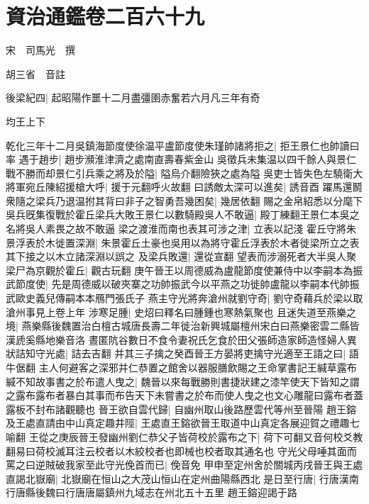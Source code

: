 \chapter{資治通鑑卷二百六十九}
宋　司馬光　撰

胡三省　音註

後梁紀四|{
	起昭陽作噩十二月盡彊圉赤奮若六月凡三年有奇}


均王上下

乾化三年十二月吳鎮海節度使徐温平盧節度使朱瑾帥諸將拒之|{
	拒王景仁也帥讀曰率}
遇于趙步|{
	趙步瀕淮津濟之處南直壽春紫金山}
吳徵兵未集温以四千餘人與景仁戰不勝而却景仁引兵乘之將及於隘|{
	隘烏介翻險狹之處為隘}
吳吏士皆失色左驍衛大將軍宛丘陳紹援槍大呼|{
	援于元翻呼火故翻}
曰誘敵太深可以進矣|{
	誘音酉}
躍馬還鬭衆隨之梁兵乃退温拊其背曰非子之智勇吾幾困矣|{
	幾居依翻}
賜之金帛紹悉以分麾下吳兵旣集復戰於霍丘梁兵大敗王景仁以數騎殿吳人不敢逼|{
	殿丁練翻王景仁本吳之名將吳人素畏之故不敢逼}
梁之渡淮而南也表其可涉之津|{
	立表以記淺}
霍丘守將朱景浮表於木徙置深淵|{
	朱景霍丘土豪也吳用以為將守霍丘浮表於木者徙梁所立之表其下接之以木立諸深淵以誤之}
及梁兵敗還|{
	還從宣翻}
望表而涉溺死者大半吳人聚梁尸為京觀於霍丘|{
	觀古玩翻}
庚午晉王以周德威為盧龍節度使兼侍中以李嗣本為振武節度使|{
	先是周德威以破夾寨之功帥振武今以平燕之功徙帥盧龍以李嗣本代帥振武歐史義兒傳嗣本本鴈門張氏子}
燕主守光將奔滄州就劉守奇|{
	劉守奇藉兵於梁以取滄州事見上卷上年}
涉寒足腫|{
	史炤曰釋名曰腫鍾也寒熱氣聚也}
且迷失道至燕樂之境|{
	燕樂縣後魏置治白檀古城唐長壽二年徙治新興城屬檀州宋白曰燕樂密雲二縣皆漢虒奚縣地樂音洛}
晝匿阬谷數日不食令妻祝氏乞食於田父張師造家師造怪婦人異狀詰知守光處|{
	詰去吉翻}
并其三子擒之癸酉晉王方晏將吏擒守光適至王語之曰|{
	語牛倨翻}
主人何避客之深邪并仁恭置之館舍以器服膳飲賜之王命掌書記王緘草露布緘不知故事書之於布遣人曳之|{
	魏晉以來每戰勝則書捷狀建之漆竿使天下皆知之謂之露布露布者暴白其事而布告天下未嘗書之於布而使人曳之也文心雕龍曰露布者蓋露板不封布諸觀聽也}
晉王欲自雲代歸|{
	自幽州取山後路歷雲代等州至晉陽}
趙王鎔及王處直請由中山真定趣井陘|{
	王處直王鎔欲晉王取道中山真定各展迎賀之禮趣七喻翻}
王從之庚辰晉王發幽州劉仁恭父子皆荷校於露布之下|{
	荷下可翻又音何校爻教翻易曰荷校滅耳注云校者以木絞校者也即械也校者取其通名也}
守光父母唾其面而罵之曰逆賊破我家至此守光俛首而已|{
	俛音免}
甲申至定州舍於關城丙戌晉王與王處直謁北嶽廟|{
	北嶽廟在恒山之大茂山恒山在定州曲陽縣西北}
是日至行唐|{
	行唐漢南行唐縣後魏曰行唐唐屬鎮州九域志在州北五十五里}
趙王鎔迎謁于路

